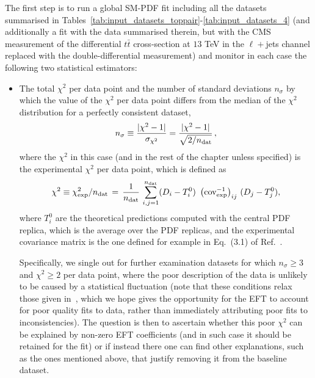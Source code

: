\documentclass[withindex,glossary]{cam-thesis}
\begin{document}
The first step is to run a global SM-PDF fit including all the datasets
summarised in Tables~\ref{tab:input_datasets_toppair}-\ref{tab:input_datasets_4}
(and additionally a fit with the data summarised therein, but with the CMS measurement of 
the differential $t\bar{t}$ cross-section at $13$ TeV in the $\ell+$jets channel replaced with 
the double-differential measurement) and monitor in each case the following two statistical estimators:

\begin{itemize}
%
\item The total $\chi^2$ per data point and the number of standard deviations $n_\sigma$ by which the value of the
  $\chi^2$ per data point differs from the median of the $\chi^2$ distribution
  for a perfectly consistent dataset,
  \begin{equation}\label{eq:nsigma}
    n_\sigma\equiv
    \frac{|\chi^2-1|}{\sigma_{\chi^2}}=\frac{|\chi^2-1|}{\sqrt{2/n_{\rm dat}}} \, ,
  \end{equation}
  where the $\chi^2$ in this case (and in the rest of the chapter unless
  specified) is the experimental $\chi^2$ per
  data point, which is defined as
  \begin{equation}\label{eq:chi2exp}
\chi^2 \equiv \chi^2_{\rm exp}/n_{\rm dat} \,=  \,\frac{1}{n_{\rm
    dat}}\,\sum_{i,j=1}^{n_{\rm dat}} (D_i-T_i^0)\,\,\left({\rm cov}_{\rm exp}^{-1}\right)_{ij}  \,(D_j-T_j^0),
  \end{equation}
  where $T_i^0$ are the theoretical predictions computed with the
  central PDF replica, which is the average over the PDF replicas, and
  the experimental covariance matrix is the one defined for example in
  Eq.~(3.1) of Ref.~\cite{Ball:2022uon}.
  
  Specifically, we single out for further examination datasets for which $n_\sigma\ge  3$
  and $\chi^2 \ge 2$ per data point, where the poor description of the data is unlikely
  to be caused by a statistical fluctuation (note that these conditions relax those given 
  in~\cite{NNPDF:2021njg}, which we hope gives the opportunity for the EFT to account for
  poor quality fits to data, rather than immediately attributing poor fits to inconsistencies).
  The question is then to ascertain whether this poor $\chi^2$ can be explained
  by non-zero EFT coefficients (and in such case it should be retained
  for the fit) or if instead there one can find other explanations,
  such as the ones mentioned above, that justify removing it from the baseline
  dataset.


\end{itemize}
\end{document}
